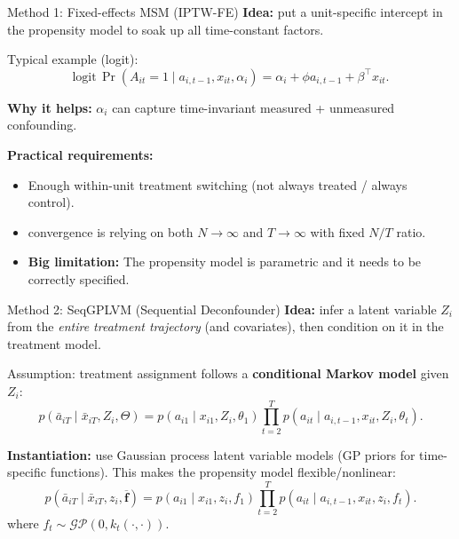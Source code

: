 \documentclass[aspectratio=169]{beamer}
\begin{document}
\begin{frame}{Method 1: Fixed-effects MSM (IPTW-FE) \cite{blackwellEffectPoliticalAdvertising2024}}
\textbf{Idea:} put a unit-specific intercept in the propensity model to soak up all time-constant factors.

\vspace{0.2cm}
Typical example (logit):
\[
\text{logit}\,\Pr(A_{it}=1 \mid a_{i,t-1},x_{it},\alpha_i)
=
\alpha_i + \phi a_{i,t-1} + \beta^\top x_{it}.
\]

\vspace{0.2cm}
\textbf{Why it helps:} $\alpha_i$ can capture time-invariant measured + unmeasured confounding.

\vspace{0.2cm}
\textbf{Practical requirements:}
\begin{itemize}
  \item Enough within-unit treatment switching (not always treated / always control).
  \item convergence is relying on both $N\to\infty$ and $T\to\infty$ with fixed $N/T$ ratio.
  \item \textbf{Big limitation:} The propensity model is parametric and it needs to be correctly specified.
\end{itemize}
\end{frame}

\begin{frame}{Method 2: SeqGPLVM (Sequential Deconfounder)\cite{hattSequentialDeconfoundingCausal2024}}
\textbf{Idea:} infer a latent variable $Z_i$ from the \emph{entire treatment trajectory} (and covariates),
then condition on it in the treatment model.

\vspace{0.2cm}
Assumption: treatment assignment follows a \textbf{conditional Markov model} given $Z_i$:
\[
p(\bar a_{iT}\mid \bar x_{iT}, Z_i, \Theta)
=
p(a_{i1}\mid x_{i1}, Z_i,\theta_1)\prod_{t=2}^T p(a_{it}\mid a_{i,t-1},x_{it},Z_i,\theta_t).
\]

\vspace{0.2cm}
\textbf{Instantiation:} use Gaussian process latent variable models (GP priors for time-specific functions).
This makes the propensity model flexible/nonlinear: 
\[
p(\bar a_{iT}\mid \bar x_{iT}, z_i, \overline{\boldsymbol{f}})
=
p(a_{i1}\mid x_{i1}, z_i,f_1)\prod_{t=2}^T p(a_{it}\mid a_{i,t-1},x_{it},z_i,f_t).
\]
where $f_t \sim \mathcal{GP}(0, k_t(\cdot, \cdot))$. 
\end{frame}
\end{document}
